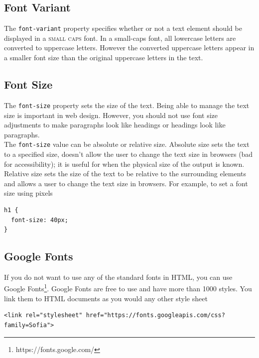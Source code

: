 \documentclass{thomasClass}
\begin{document}
\subsection{Font Variant}
The \verb|font-variant| property specifies whether or not a text element should be displayed in a \textsc{small caps} font. In a small-caps font, all lowercase letters are converted to uppercase letters. However the converted uppercase letters appear in a smaller font size than the original uppercase letters in the text.
\subsection{Font Size}
The \verb|font-size| property sets the size of the text. Being able to manage the text size is important in web design. However, you should not use font size adjustments to make paragraphs look like headings or headings look like paragraphs.\\
The \verb|font-size| value can be absolute or relative size. Absolute size sets the text to a specified size, doesn't allow the user to change the text size in browsers (bad for accessibility); it is useful for when the physical size of the output is known. Relative size sets the size of the text to be relative to the surrounding elements and allows a user to change the text size in browsers. For example, to set a font size using pixels
\begin{Verbatim}[breaklines=true, breakanywhere=true]
h1 {
  font-size: 40px;
}
\end{Verbatim}
\subsection{Google Fonts}
If you do not want to use any of the standard fonts in HTML, you can use Google Fonts\footnote{https://fonts.google.com/}. Google Fonts are free to use and have more than 1000 styles. You link them to HTML documents as you would any other style sheet
\begin{Verbatim}[breaklines=true, breakanywhere=true]
<link rel="stylesheet" href="https://fonts.googleapis.com/css?family=Sofia">
\end{Verbatim}
\end{document}
